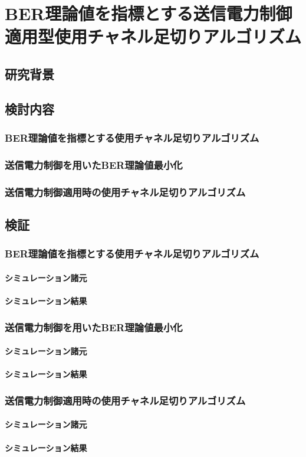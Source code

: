 \chapter{BER理論値を指標とする送信電力制御適用型使用チャネル足切りアルゴリズム
}

\section{研究背景}

\section{検討内容}
\subsection{BER理論値を指標とする使用チャネル足切りアルゴリズム}
\subsection{送信電力制御を用いたBER理論値最小化}
\subsection{送信電力制御適用時の使用チャネル足切りアルゴリズム}

\section{検証}
\subsection{BER理論値を指標とする使用チャネル足切りアルゴリズム}
\subsubsection{シミュレーション諸元}
\subsubsection{シミュレーション結果}
\subsection{送信電力制御を用いたBER理論値最小化}
\subsubsection{シミュレーション諸元}
\subsubsection{シミュレーション結果}
\subsection{送信電力制御適用時の使用チャネル足切りアルゴリズム}
\subsubsection{シミュレーション諸元}
\subsubsection{シミュレーション結果}
